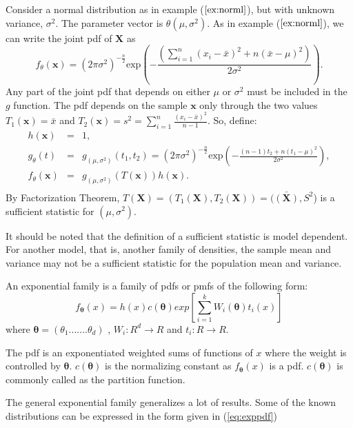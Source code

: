 \documentclass[a4paper,english,12pt]{article}
\newcommand{\bx}{\mathbf{x}}
\newcommand{\bX}{\mathbf{X}}
\newcommand{\btheta}{\boldsymbol{\theta}}
\begin{document}
\begin{exmp}
Consider a normal distribution as in example ($\ref{ex:norml}$), but with unknown variance, $\sigma^2$. The parameter vector is $\theta(\mu,\sigma^2)$. As in example ($\ref{ex:norml}$), we can write the joint pdf of $\bX$ as
\begin{equation}
f_\theta(\bx) = (2\pi\sigma^2)^{-\frac{n}{2}}\text{exp}\left(-\frac{\left(\sum_{i=1}^{n}{(x_i-\bar{x})^2}+n(\bar{x}-\mu)^2\right)}{2\sigma^2}\right). 
\end{equation}
Any part of the joint pdf that depends on either $\mu$ or $\sigma^2$ must be included in the $g$ function. The pdf depends on the sample $\bx$ only through the two values $T_1(\bx) = \bar{x}$ and $T_2(\bx) = s^2= \sum_{i=1}^{n}{\frac{(x_i-\bar{x})^2}{n-1}}$.
So, define:
\begin{eqnarray}
h(\bx)&=& 1,	\nonumber \\
g_\theta(t) &=& g_{(\mu,\sigma^2)}(t_1,t_2)=(2\pi\sigma^2)^{-\frac{n}{2}}\text{exp}\left(-\frac{(n-1)t_2+n(t_1-\mu)^2}{2\sigma^2}\right),\nonumber \\
f_\theta(\bx) &=& g_{(\mu,\sigma^2)}(T(\bx))h(\bx). \nonumber \\
\end{eqnarray}
By Factorization Theorem, $T(\bX)=(T_1(\bX),T_2(\bX)) = (\bar{(\bX)},S^2$) is a sufficient statistic for $(\mu,\sigma^2)$.
\par It should be noted that the definition of a sufficient statistic is model dependent. For another model, that is, another family of densities, the sample mean and variance may not be a sufficient statistic for the population mean and variance.
\end{exmp}
\begin{defn}
An exponential family is a family of pdfs or pmfs of the following form:
\begin{equation} \label{eq:exppdf}
f_{\btheta}(x) = h(x)c(\btheta)exp[\sum_{i=1}^{k} W_i(\btheta)t_i(x)]  
\end{equation}
where $\btheta = (\theta_1 ....... \theta_d)$ , $W_i:R^d\rightarrow R$ and $t_i:R\rightarrow R$.
\end{defn}
 The pdf is an exponentiated weighted sums of functions of $x$ where the weight is controlled by $\btheta$. $c(\btheta)$ is the normalizing constant as $f_{\btheta}(x)$ is a pdf. $c(\btheta)$ is commonly called as the partition function.
 \par The general exponential family generalizes a lot of results. Some of the known distributions can be expressed in the form given in (\ref{eq:exppdf}) 
\end{document}
